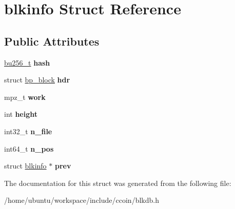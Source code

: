 \hypertarget{structblkinfo}{\section{blkinfo Struct Reference}
\label{structblkinfo}
}
\subsection*{Public Attributes}
\begin{DoxyCompactItemize}
\item 
\hypertarget{structblkinfo_acb979659f0946d2f6b89512f7b112e83}{\hyperlink{structbu256}{bu256\-\_\-t} {\bfseries hash}}\label{structblkinfo_acb979659f0946d2f6b89512f7b112e83}

\item 
\hypertarget{structblkinfo_a369831c15e54d48e318c96c30f5f01e2}{struct \hyperlink{structbp__block}{bp\-\_\-block} {\bfseries hdr}}\label{structblkinfo_a369831c15e54d48e318c96c30f5f01e2}

\item 
\hypertarget{structblkinfo_ac7b3f6aa68e8b3230fc1061e056b643f}{mpz\-\_\-t {\bfseries work}}\label{structblkinfo_ac7b3f6aa68e8b3230fc1061e056b643f}

\item 
\hypertarget{structblkinfo_a342e96e895940f919b7488d55d75d555}{int {\bfseries height}}\label{structblkinfo_a342e96e895940f919b7488d55d75d555}

\item 
\hypertarget{structblkinfo_a153d3e6b4c9f34d5b24cf5b612bbd83c}{int32\-\_\-t {\bfseries n\-\_\-file}}\label{structblkinfo_a153d3e6b4c9f34d5b24cf5b612bbd83c}

\item 
\hypertarget{structblkinfo_a81e082905848657b5e13f1b9c9a81e7e}{int64\-\_\-t {\bfseries n\-\_\-pos}}\label{structblkinfo_a81e082905848657b5e13f1b9c9a81e7e}

\item 
\hypertarget{structblkinfo_a2b1d04caa863f80fec9ceb46517cae30}{struct \hyperlink{structblkinfo}{blkinfo} $\ast$ {\bfseries prev}}\label{structblkinfo_a2b1d04caa863f80fec9ceb46517cae30}

\end{DoxyCompactItemize}


The documentation for this struct was generated from the following file\-:\begin{DoxyCompactItemize}
\item 
/home/ubuntu/workspace/include/ccoin/blkdb.\-h\end{DoxyCompactItemize}
